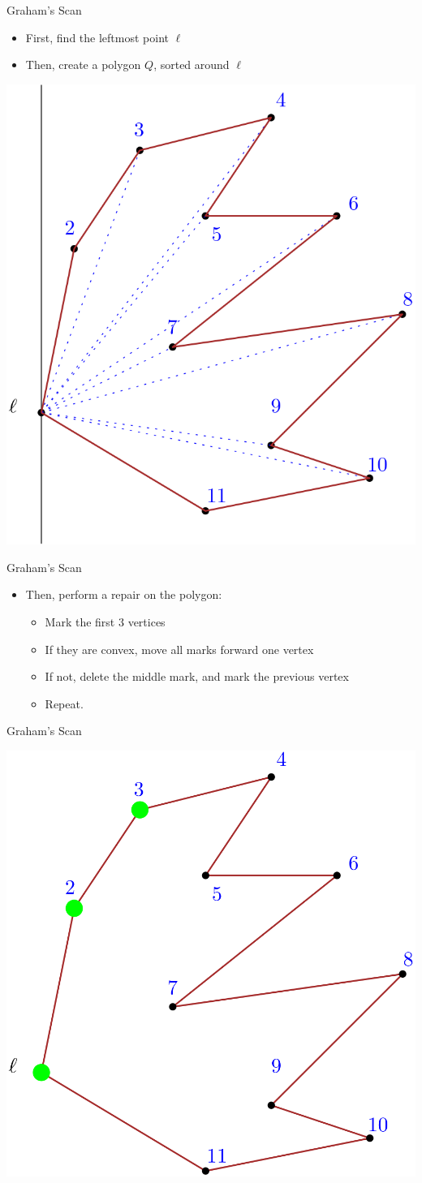 \documentclass[aspectratio=169]{beamer}
\begin{document}
\begin{frame}{Graham's Scan}
    \begin{itemize}
        \item First, find the leftmost point $\ell$
        \item Then, create a polygon $Q$, sorted around $\ell$
    \end{itemize}
    \begin{center}
        \includegraphics[width=.4\textwidth]{graham_pt1.png}
    \end{center}
\end{frame}

\begin{frame}{Graham's Scan}
    \begin{itemize}
        \item Then, perform a repair on the polygon:
        \begin{itemize}
            \item Mark the first 3 vertices \pause
            \item If they are convex, move all marks forward one vertex \pause
            \item If not, delete the middle mark, and mark the previous vertex \pause
            \item Repeat.
        \end{itemize}
    \end{itemize}
\end{frame}

\begin{frame}{Graham's Scan}
    \begin{center}
        \includegraphics[width=.5\textwidth]{graham_pt2.png}
    \end{center}
\end{frame}
\end{document}
